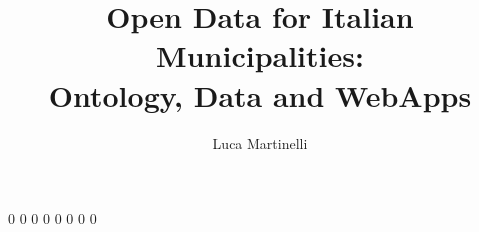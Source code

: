 \documentclass{DEIThesis}
\title{Open Data for Italian Municipalities: \\ Ontology, Data and WebApps}
\author{Luca Martinelli}
\begin{document}
    \frontmatter

    \mainmatter
    
    {0}
    {0}
    {0}
    {0}
    {0}
    {0}
    {0}
    {0}
    
    \backmatter
\end{document}
